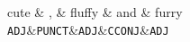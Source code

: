 \begin{dependency}
  \begin{deptext}[column sep=0.4cm]
      cute \& , \& fluffy \& and \& furry \\
    {\tt ADJ}\&{\tt PUNCT}\&{\tt ADJ}\&{\tt CCONJ}\&{\tt ADJ} \\
  \end{deptext}
\end{dependency} \\